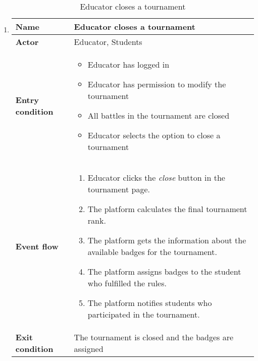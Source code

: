 \begin{enumerate}[label=\textbf{UC\arabic*}:,leftmargin=1.3cm]
      \item \textbf{}
            \begin{table}[H]
                  \centering
                  \begin{tabular}{|l|p{11.9cm}|}
                        \hline
                        \textbf{Name}            & Educator closes a tournament                     \\\hline
                        \textbf{Actor}           & Educator, Students                                   \\\hline
                        \textbf{Entry condition} &
                        \begin{itemize}
                              \item Educator has logged in
                              \item Educator has permission to modify the tournament
                              \item All battles in the tournament are closed
                              \item Educator selects the option to close a tournament
                        \end{itemize}                           \\\hline
                        \textbf{Event flow}      &
                        \begin{enumerate}[label=\arabic*.]
                              \item Educator clicks the \emph{close} button in the tournament page.
                              \item The platform calculates the final tournament rank.
                              \item The platform gets the information about the available badges for the tournament.
                              \item The platform assigns badges to the student who fulfilled the rules.
                              \item The platform notifies students who participated in the tournament.
                        \end{enumerate}        \\\hline
                        \textbf{Exit condition}  & The tournament is closed and the badges are assigned \\\hline
                  \end{tabular}
                  \caption{Educator closes a tournament   }
                  \label{table:Educator closes a tournament   }
            \end{table}


\end{enumerate}
